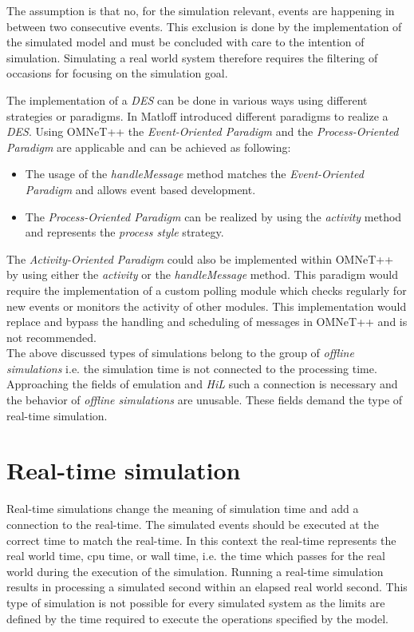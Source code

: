 The assumption is that no, for the simulation relevant, events are happening in between two consecutive events.
This exclusion is done by the implementation of the simulated model and must be concluded with care to the intention of simulation.
Simulating a real world system therefore requires the filtering of occasions for focusing on the simulation goal. \cite[section 4.1.1]{omnet_manual}

The implementation of a \emph{DES} can be done in various ways using different strategies or paradigms.
In \cite[chapter 2]{matloff_introduction_2008} Matloff introduced different paradigms to realize a \emph{DES}.
Using OMNeT++ the \emph{Event-Oriented Paradigm} and the \emph{Process-Oriented Paradigm} are applicable and can be achieved as following:

\begin{itemize}
    \item The usage of the \emph{handleMessage} method matches the \emph{Event-Oriented Paradigm} and allows event based development.
    \item The \emph{Process-Oriented Paradigm} can be realized by using the \emph{activity} method and represents the \emph{process style} strategy.
\end{itemize}

The \emph{Activity-Oriented Paradigm} could also be implemented within OMNeT++ by using either the \emph{activity} or the \emph{handleMessage} method.
This paradigm would require the implementation of a custom polling module which checks regularly for new events or monitors the activity of other modules.
This implementation would replace and bypass the handling and scheduling of messages in OMNeT++ and is not recommended. \cite[chapter 2.1]{matloff_introduction_2008}
\\

The above discussed types of simulations belong to the group of \emph{offline simulations} i.e. the simulation time is not connected to the processing time.
Approaching the fields of emulation and \emph{HiL} such a connection is necessary and the behavior of \emph{offline simulations} are unusable.
These fields demand the type of real-time simulation.  \cite[section III.B]{belanger_what_2010}

\section{Real-time simulation}
\label{sec:simulation_real_time}
Real-time simulations change the meaning of simulation time and add a connection to the real-time.
The simulated events should be executed at the correct time to match the real-time.
In this context the real-time represents the real world time, cpu time, or wall time, i.e. the time which passes for the real world during the execution of the simulation.
Running a real-time simulation results in processing a simulated second within an elapsed real world second.
This type of simulation is not possible for every simulated system as the limits are defined by the time required to execute the operations specified by the model.

